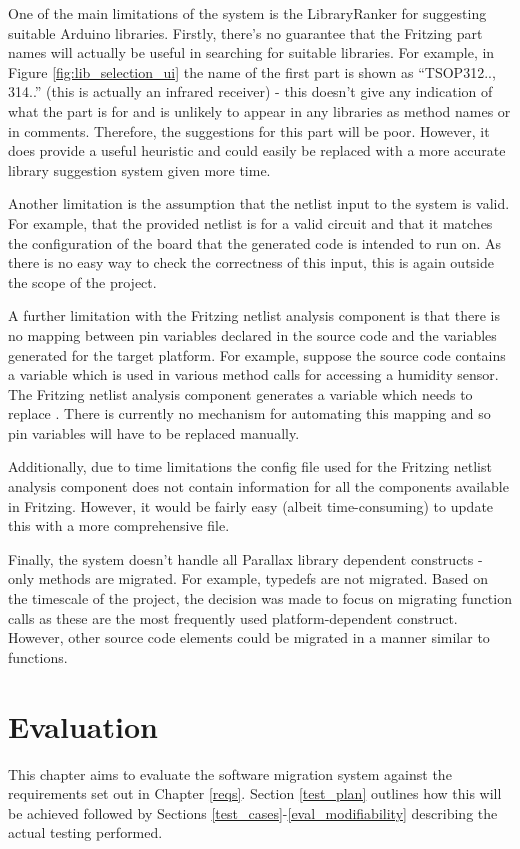 \documentclass{UoYCSproject}
\begin{document}
One of the main limitations of the system is the LibraryRanker for suggesting suitable Arduino libraries. Firstly, there's no guarantee that the Fritzing part names will actually be useful in searching for suitable libraries. For example, in Figure \ref{fig:lib_selection_ui} the name of the first part is shown as ``TSOP312.., 314..'' (this is actually an infrared receiver) - this doesn't give any indication of what the part is for and is unlikely to appear in any libraries as method names or in comments. Therefore, the suggestions for this part will be poor. However, it does provide a useful heuristic and could easily be replaced with a more accurate library suggestion system given more time.

Another limitation is the assumption that the netlist input to the system is valid. For example, that the provided netlist is for a valid circuit and that it matches the configuration of the board that the generated code is intended to run on. As there is no easy way to check the correctness of this input, this is again outside the scope of the project.

A further limitation with the Fritzing netlist analysis component is that there is no mapping between pin variables declared in the source code and the variables generated for the target platform. For example, suppose the source code contains a variable  which is used in various method calls for accessing a humidity sensor. The Fritzing netlist analysis component generates a variable  which needs to replace . There is currently no mechanism for automating this mapping and so pin variables will have to be replaced manually.

Additionally, due to time limitations the config file used for the Fritzing netlist analysis component does not contain information for all the components available in Fritzing. However, it would be fairly easy (albeit time-consuming) to update this with a more comprehensive file.

Finally, the system doesn't handle all Parallax library dependent constructs - only methods are migrated. For example, typedefs are not migrated. Based on the timescale of the project, the decision was made to focus on migrating function calls as these are the most frequently used platform-dependent construct. However, other source code elements could be migrated in a manner similar to functions.

\chapter{Evaluation} \label{eval_chapt}
This chapter aims to evaluate the software migration system against the requirements set out in Chapter \ref{reqs}. Section \ref{test_plan} outlines how this will be achieved followed by Sections \ref{test_cases}-\ref{eval_modifiability} describing the actual testing performed.
\end{document}
